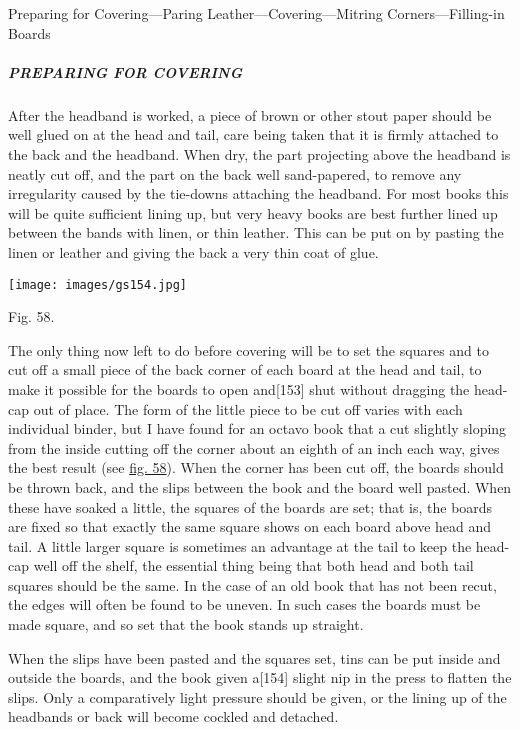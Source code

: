 \documentclass[
]{article}
\begin{document}
Preparing for Covering---Paring Leather---Covering---Mitring
Corners---Filling-in Boards

\hypertarget{preparing-for-covering}{%
\subparagraph{PREPARING FOR COVERING}\label{preparing-for-covering}}

{After} the headband is worked, a piece of brown or other stout paper
should be well glued on at the head and tail, care being taken that it
is firmly attached to the back and the headband. When dry, the part
projecting above the headband is neatly cut off, and the part on the
back well sand-papered, to remove any irregularity caused by the
tie-downs attaching the headband. For most books this will be quite
sufficient lining up, but very heavy books are best further lined up
between the bands with linen, or thin leather. This can be put on by
pasting the linen or leather and giving the back a very thin coat of
glue.

\protect\hypertarget{Fig_58}{}{}
\texttt{[image: images/gs154.jpg]}

Fig. 58.

The only thing now left to do before covering will be to set the squares
and to cut off a small piece of the back corner of each board at the
head and tail, to make it possible for the boards to open
and{\protect\hypertarget{Page_153}{}{{[}153{]}}} shut without dragging
the head-cap out of place. The form of the little piece to be cut off
varies with each individual binder, but I have found for an octavo book
that a cut slightly sloping from the inside cutting off the corner about
an eighth of an inch each way, gives the best result (see
\protect\hyperlink{Fig_58}{fig. 58}). When the corner has been cut off,
the boards should be thrown back, and the slips between the book and the
board well pasted. When these have soaked a little, the squares of the
boards are set; that is, the boards are fixed so that exactly the same
square shows on each board above head and tail. A little larger square
is sometimes an advantage at the tail to keep the head-cap well off the
shelf, the essential thing being that both head and both tail squares
should be the same. In the case of an old book that has not been recut,
the edges will often be found to be uneven. In such cases the boards
must be made square, and so set that the book stands up straight.

When the slips have been pasted and the squares set, tins can be put
inside and outside the boards, and the book given
a{\protect\hypertarget{Page_154}{}{{[}154{]}}} slight nip in the press
to flatten the slips. Only a comparatively light pressure should be
given, or the lining up of the headbands or back will become cockled and
detached.
\end{document}
